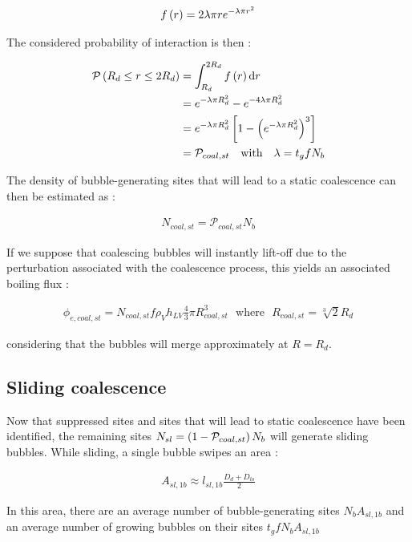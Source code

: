 \begin{align}
f\left( r \right)=2\lambda \pi r e^{-\lambda \pi r^{2}}
\end{align} 

The considered probability of interaction is then :

\begin{align}
\mathcal{P}\parth{R_{d}\leq r \leq 2R_{d}} &=\int_{R_{d}}^{2R_{d}}f\parth{r} \mathrm{d}r \\
%
&= e^{-\lambda \pi R_{d}^{2}} - e^{-4\lambda \pi R_{d}^{2}}\\
%
&= e^{-\lambda \pi R_{d}^{2}}\crocht{1-\parth{e^{-\lambda \pi R_{d}^{2}}}^{3}} \\
&= \mathcal{P}_{coal,st} \ \ \ \text{with}\ \ \ \lambda=t_{g} f N_{b}
\end{align}

The density of bubble-generating sites that will lead to a static coalescence can then be estimated as :

\begin{align}
N_{coal,st}=\mathcal{P}_{coal,st}N_{b}
\end{align}

If we suppose that coalescing bubbles will instantly lift-off due to the perturbation associated with the coalescence process, this yields an associated boiling flux :

\begin{align}
\phi_{e,coal,st}=N_{coal,st} f \rho_{V}h_{LV} \frac{4}{3}\pi R_{coal,st}^{3} \ \ \ \text{where}\ \ \ R_{coal,st}=\sqrt[3]{2}R_{d} 
\end{align}

considering that the bubbles will merge approximately at $R=R_{d}$.

\subsection{Sliding coalescence}

Now that suppressed sites and sites that will lead to static coalescence have been identified, the remaining sites $N_{sl}=\left( 1-\mathcal{P}_{coal,st} \right)N_{b}$ will generate sliding bubbles. While sliding, a single bubble swipes an area :

\begin{align}
A_{sl, 1b} \approx l_{sl,1b}\frac{D_{d}+D_{lo}}{2}
\end{align}

In this area, there are an average number of bubble-generating sites $N_{b}A_{sl,1b}$ and an average number of growing bubbles on their sites $t_{g}f N_{b}A_{sl,1b}$

